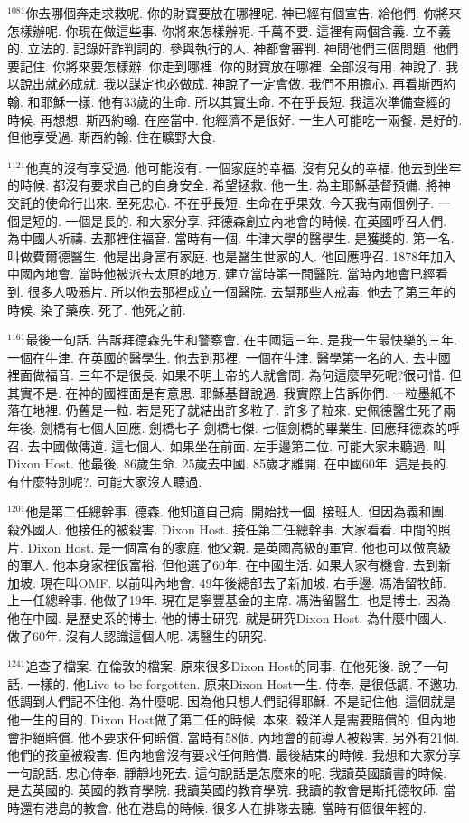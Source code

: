 \documentclass{book}
\begin{document}
$^{1081}$你去哪個奔走求救呢.
你的財寶要放在哪裡呢.
神已經有個宣告.
給他們.
你將來怎樣辦呢.
你現在做這些事.
你將來怎樣辦呢.
千萬不要.
這裡有兩個含義.
立不義的.
立法的.
記錄奸詐判詞的.
參與執行的人.
神都會審判.
神問他們三個問題.
他們要記住.
你將來要怎樣辦.
你走到哪裡.
你的財寶放在哪裡.
全部沒有用.
神說了.
我以說出就必成就.
我以謀定也必做成.
神說了一定會做.
我們不用擔心.
再看斯西約翰.
和耶穌一樣.
他有33歲的生命.
所以其實生命.
不在乎長短.
我這次準備查經的時候.
再想想.
斯西約翰.
在座當中.
他經濟不是很好.
一生人可能吃一兩餐.
是好的.
但他享受過.
斯西約翰.
住在曠野大食.

$^{1121}$他真的沒有享受過.
他可能沒有.
一個家庭的幸福.
沒有兒女的幸福.
他去到坐牢的時候.
都沒有要求自己的自身安全.
希望拯救.
他一生.
為主耶穌基督預備.
將神交託的使命行出來.
至死忠心.
不在乎長短.
生命在乎果效.
今天我有兩個例子.
一個是短的.
一個是長的.
和大家分享.
拜德森創立內地會的時候.
在英國呼召人們.
為中國人祈禱.
去那裡住福音.
當時有一個.
牛津大學的醫學生.
是獲獎的.
第一名.
叫做費爾德醫生.
他是出身富有家庭.
也是醫生世家的人.
他回應呼召.
1878年加入中國內地會.
當時他被派去太原的地方.
建立當時第一間醫院.
當時內地會已經看到.
很多人吸鴉片.
所以他去那裡成立一個醫院.
去幫那些人戒毒.
他去了第三年的時候.
染了藥疾.
死了.
他死之前.

$^{1161}$最後一句話.
告訴拜德森先生和警察會.
在中國這三年.
是我一生最快樂的三年.
一個在牛津.
在英國的醫學生.
他去到那裡.
一個在牛津.
醫學第一名的人.
去中國裡面做福音.
三年不是很長.
如果不明上帝的人就會問.
為何這麼早死呢?很可惜.
但其實不是.
在神的國裡面是有意思.
耶穌基督說過.
我實際上告訴你們.
一粒墨紙不落在地裡.
仍舊是一粒.
若是死了就結出許多粒子.
許多子粒來.
史佩德醫生死了兩年後.
劍橋有七個人回應.
劍橋七子 劍橋七傑.
七個劍橋的畢業生.
回應拜德森的呼召.
去中國做傳道.
這七個人.
如果坐在前面.
左手邊第二位.
可能大家未聽過.
叫Dixon Host.
他最後.
86歲生命.
25歲去中國.
85歲才離開.
在中國60年.
這是長的.
有什麼特別呢?.
可能大家沒人聽過.

$^{1201}$他是第二任總幹事.
德森.
他知道自己病.
開始找一個.
接班人.
但因為義和團.
殺外國人.
他接任的被殺害.
Dixon Host.
接任第二任總幹事.
大家看看.
中間的照片.
Dixon Host.
是一個富有的家庭.
他父親.
是英國高級的軍官.
他也可以做高級的軍人.
他本身家裡很富裕.
但他選了60年.
在中國生活.
如果大家有機會.
去到新加坡.
現在叫OMF.
以前叫內地會.
49年後總部去了新加坡.
右手邊.
馮浩留牧師.
上一任總幹事.
他做了19年.
現在是寧豐基金的主席.
馮浩留醫生.
也是博士.
因為他在中國.
是歷史系的博士.
他的博士研究.
就是研究Dixon Host.
為什麼中國人.
做了60年.
沒有人認識這個人呢.
馮醫生的研究.

$^{1241}$追查了檔案.
在倫敦的檔案.
原來很多Dixon Host的同事.
在他死後.
說了一句話.
一樣的.
他Live to be forgotten.
原來Dixon Host一生.
侍奉.
是很低調.
不邀功.
低調到人們記不住他.
為什麼呢.
因為他只想人們記得耶穌.
不是記住他.
這個就是他一生的目的.
Dixon Host做了第二任的時候.
本來.
殺洋人是需要賠償的.
但內地會拒絕賠償.
他不要求任何賠償.
當時有58個.
內地會的前導人被殺害.
另外有21個.
他們的孩童被殺害.
但內地會沒有要求任何賠償.
最後結束的時候.
我想和大家分享一句說話.
忠心侍奉.
靜靜地死去.
這句說話是怎麼來的呢.
我讀英國讀書的時候.
是去英國的.
英國的教育學院.
我讀英國的教育學院.
我讀的教會是斯托德牧師.
當時還有港島的教會.
他在港島的時候.
很多人在排隊去聽.
當時有個很年輕的.
\end{document}

